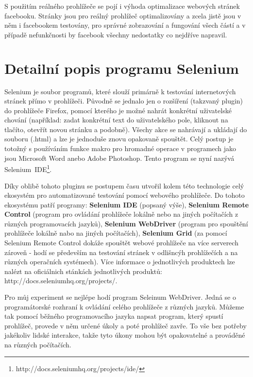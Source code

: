 \documentclass[thesis=M,czech]{FITthesis}[2013/05/10]
\begin{document}
S použitím reálného prohlížeče se pojí i výhoda optimalizace webových 
stránek facebooku. Stránky jsou pro reálný prohlížeč optimalizovány a 
zcela jistě jsou v něm i facebookem testovány, pro správné 
zobrazování a fungování všech částí a v případě nefunkčnosti by 
facebook všechny nedostatky co nejdříve napravil. 

\section{Detailní popis programu Selenium}
Selenium je soubor programů, které slouží primárně k testování 
internetových stránek přímo v prohlížeči. Původně se jednalo jen o 
rozšíření (takzvaný plugin) do prohlížeče Firefox, pomocí kterého je 
možné nahrát konkrétní uživatelské chování (například: zadat konkrétní 
text do uživatelského pole, kliknout na tlačíto, otevřít novou stránku 
a podobně). Všechy akce se nahrávají a ukládají do souboru (.html) a 
lze je jednoduše znovu opakovaně spouštět. Celý postup je totožný s 
používáním funkce makro pro hromadné operace v programech jako jsou 
Microsoft Word anebo Adobe Photoshop. Tento program se nyní nazývá 
Selenium~IDE\footnote{http://docs.seleniumhq.org/projects/ide/}.

Díky oblibě tohoto pluginu se postupem času utvořil kolem této 
technologie celý ekosystém pro automatizované testování pomocí 
webového prohlížeče. Do tohoto ekosystému patří programy: 
\textbf{Selenium IDE} (popsaný výše), 
\textbf{Selenium Remote Control} (program pro ovládání prohlížeče 
lokálně nebo na jiných počítačích z různých programovacích jazyků), 
\textbf{Selenium WebDriver} (program pro spouštění prohlížeče lokálně 
nabo na jiných počítačích), 
\textbf{Selenium Grid} (za pomocí Selenium Remote Control dokáže 
spouštět webové prohlížeče na více serverech zároveň - hodí se 
především na testování stránek v odlišncýh prohlížečích a na různých 
operačních systémech). Více informace o jednotlivých produktech lze 
nalézt na oficiálnich stánkách jednotlivých produktů: 
http://docs.seleniumhq.org/projects/. 

Pro můj experiment se nejlépe hodí program Seleinum WebDriver. Jedná 
se o programátorské rozhraní k ovládání celého prohlížeče z různých 
jazyků. Můžeme tak pomocí běžného programovacího jazyka napsat 
program, který spustí prohlížeč, provede v něm určené úkoly a poté 
prohlížeč zavře. To vše bez potřeby jakékoliv lidské interakce, takže 
tyto úkony mohou být opakovatelné a prováděné na různých počítačích.
\end{document}
